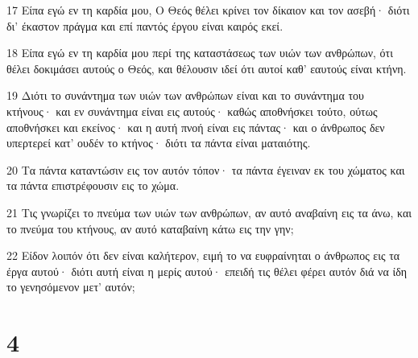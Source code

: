 \par 17 Είπα εγώ εν τη καρδία μου, Ο Θεός θέλει κρίνει τον δίκαιον και τον ασεβή· διότι δι' έκαστον πράγμα και επί παντός έργου είναι καιρός εκεί.
\par 18 Είπα εγώ εν τη καρδία μου περί της καταστάσεως των υιών των ανθρώπων, ότι θέλει δοκιμάσει αυτούς ο Θεός, και θέλουσιν ιδεί ότι αυτοί καθ' εαυτούς είναι κτήνη.
\par 19 Διότι το συνάντημα των υιών των ανθρώπων είναι και το συνάντημα του κτήνους· και εν συνάντημα είναι εις αυτούς· καθώς αποθνήσκει τούτο, ούτως αποθνήσκει και εκείνος· και η αυτή πνοή είναι εις πάντας· και ο άνθρωπος δεν υπερτερεί κατ' ουδέν το κτήνος· διότι τα πάντα είναι ματαιότης.
\par 20 Τα πάντα καταντώσιν εις τον αυτόν τόπον· τα πάντα έγειναν εκ του χώματος και τα πάντα επιστρέφουσιν εις το χώμα.
\par 21 Τις γνωρίζει το πνεύμα των υιών των ανθρώπων, αν αυτό αναβαίνη εις τα άνω, και το πνεύμα του κτήνους, αν αυτό καταβαίνη κάτω εις την γην;
\par 22 Είδον λοιπόν ότι δεν είναι καλήτερον, ειμή το να ευφραίνηται ο άνθρωπος εις τα έργα αυτού· διότι αυτή είναι η μερίς αυτού· επειδή τις θέλει φέρει αυτόν διά να ίδη το γενησόμενον μετ' αυτόν;

\chapter{4}

